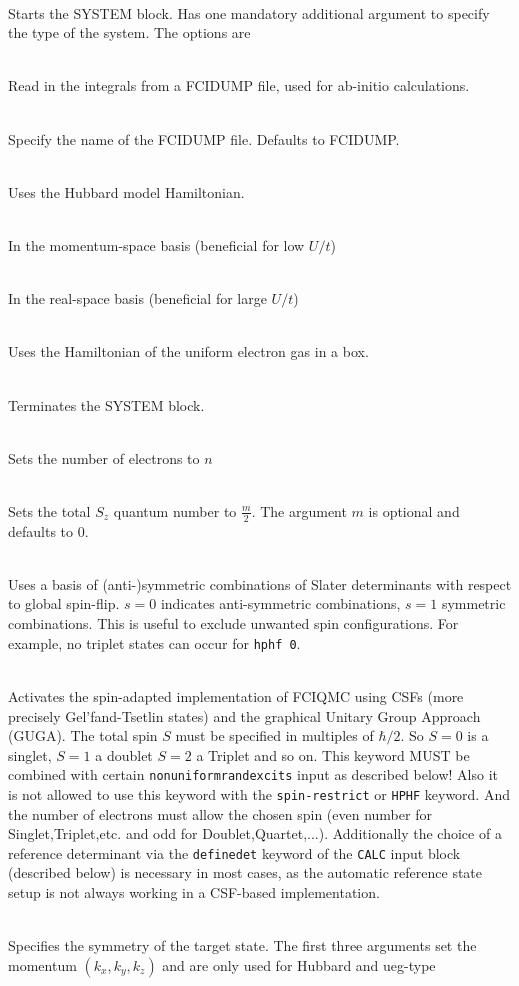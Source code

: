 \documentclass[a4paper,notitlepage,dvipsnames]{scrreprt}
\newcommand\codeitem[1]{\needspace{1.5\baselineskip}\item[\textnormal{\ttfamily #1 \nopagebreak}] \hfill \\ \nopagebreak}
\begin{document}
\begin{description}
  \codeitem{\textcolor{mred}{system}}
  Starts the SYSTEM block. Has one mandatory additional argument to specify
  the type of the system. The options are
  \begin{description}
    \codeitem{read}
    Read in the integrals from a FCIDUMP file, used for ab-initio calculations.
    \codeitem{FCIDUMP-name}
    Specify the name of the FCIDUMP file. Defaults to FCIDUMP.
    \codeitem{hubbard}
    Uses the Hubbard model Hamiltonian.
    \begin{description}
	\codeitem{k-space} In the momentum-space basis (beneficial for low $U/t$)
	\codeitem{real-space} In the real-space basis (beneficial for large $U/t$)
    \end{description}
    \codeitem{ueg}
    Uses the Hamiltonian of the uniform electron gas in a box.
  \end{description}
  \codeitem{\textcolor{mred}{endsys}}
  Terminates the SYSTEM block.
  \codeitem{\textcolor{mred}{electrons $n$, nel $n$}}
  Sets the number of electrons to $n$
  \codeitem{spin-restrict [$m$]}
  Sets the total $S_z$ quantum number to $\frac{m}{2}$. The argument $m$ is
  optional and defaults to 0.
  \codeitem{hphf $s$}
  Uses a basis of (anti-)symmetric combinations of Slater determinants with
  respect to global spin-flip. $s=0$ indicates anti-symmetric combinations,
  $s=1$ symmetric combinations. This is useful to exclude unwanted spin
  configurations. For example, no triplet states can occur for \texttt{hphf 0}.
  \codeitem{guga $S$}
  Activates the spin-adapted implementation of FCIQMC using CSFs (more precisely Gel'fand-Tsetlin states) and the graphical Unitary Group Approach (GUGA). The total spin $S$ must be specified in multiples of $\hbar/2$.
  So $S = 0$ is a singlet, $S = 1$ a doublet $S = 2$ a Triplet and so on.
  This keyword MUST be combined with certain \texttt{nonuniformrandexcits} input as described below! Also it is not allowed to use this keyword with the
  \texttt{spin-restrict} or \texttt{HPHF} keyword. And the number of electrons must allow the chosen spin (even number for Singlet,Triplet,etc. and odd for Doublet,Quartet,...). Additionally the choice of a reference determinant via the \texttt{definedet} keyword of the \texttt{CALC} input block (described below) is necessary in most cases, as the automatic reference state setup is not always working in a CSF-based implementation.
  \codeitem{sym $k_x$ $k_y$ $k_z$ $s$}
  Specifies the symmetry of the target state. The first three arguments set
  the momentum $(k_x,k_y,k_z)$ and are only used for Hubbard and ueg-type

\end{description}
\end{document}

